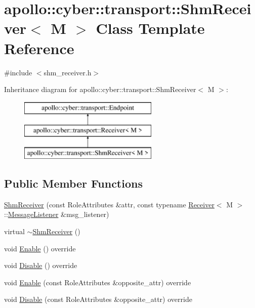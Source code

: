 \hypertarget{classapollo_1_1cyber_1_1transport_1_1ShmReceiver}{\section{apollo\-:\-:cyber\-:\-:transport\-:\-:Shm\-Receiver$<$ M $>$ Class Template Reference}
\label{classapollo_1_1cyber_1_1transport_1_1ShmReceiver}
}


{\ttfamily \#include $<$shm\-\_\-receiver.\-h$>$}

Inheritance diagram for apollo\-:\-:cyber\-:\-:transport\-:\-:Shm\-Receiver$<$ M $>$\-:\begin{figure}[H]
\begin{center}
\leavevmode
\includegraphics[height=3.000000cm]{classapollo_1_1cyber_1_1transport_1_1ShmReceiver}
\end{center}
\end{figure}
\subsection*{Public Member Functions}
\begin{DoxyCompactItemize}
\item 
\hyperlink{classapollo_1_1cyber_1_1transport_1_1ShmReceiver_ae40a34997049cdf61df823e06cb2b54e}{Shm\-Receiver} (const Role\-Attributes \&attr, const typename \hyperlink{classapollo_1_1cyber_1_1transport_1_1Receiver}{Receiver}$<$ M $>$\-::\hyperlink{classapollo_1_1cyber_1_1transport_1_1Receiver_abd906fd03582b49acbdc81b48a8974aa}{Message\-Listener} \&msg\-\_\-listener)
\item 
virtual \hyperlink{classapollo_1_1cyber_1_1transport_1_1ShmReceiver_a3cd047adbec5e567f34003871fe6e058}{$\sim$\-Shm\-Receiver} ()
\item 
void \hyperlink{classapollo_1_1cyber_1_1transport_1_1ShmReceiver_a8e0e9bb92682c19452714377d7b7085f}{Enable} () override
\item 
void \hyperlink{classapollo_1_1cyber_1_1transport_1_1ShmReceiver_afcf2bfb1a7a604c9b80b14f0d5e2cb94}{Disable} () override
\item 
void \hyperlink{classapollo_1_1cyber_1_1transport_1_1ShmReceiver_ae484aefe5ab646b4d4439fdef4b2c89a}{Enable} (const Role\-Attributes \&opposite\-\_\-attr) override
\item 
void \hyperlink{classapollo_1_1cyber_1_1transport_1_1ShmReceiver_a8c1fab03189119797ff3de40b02342d8}{Disable} (const Role\-Attributes \&opposite\-\_\-attr) override
\end{DoxyCompactItemize}
